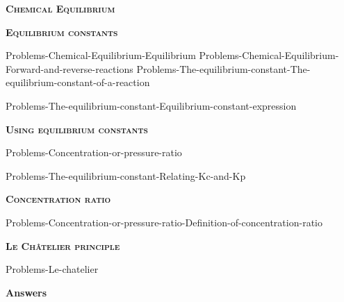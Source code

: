 \documentclass[main.tex]{subfiles}
\newcommand\chapterlabel{Ch-equilibrium}
\begin{document}
\newpage

\fancyhfoffset[E,O]{0pt}
\setlength{\columnsep}{30pt}
\begin{conclusion}
\end{conclusion}
\begin{multicols*}{2}\setcounter{numA}{1}



{\raggedright\textsc{\textbf{Chemical Equilibrium }}\par}



{\raggedright\textsc{\textbf{Equilibrium constants }}\par}






{Problems-Chemical-Equilibrium-Equilibrium}
{Problems-Chemical-Equilibrium-Forward-and-reverse-reactions}
{Problems-The-equilibrium-constant-The-equilibrium-constant-of-a-reaction}

{Problems-The-equilibrium-constant-Equilibrium-constant-expression}






{\raggedright\textsc{\textbf{Using equilibrium constants }}\par}
{Problems-Concentration-or-pressure-ratio}

{Problems-The-equilibrium-constant-Relating-Kc-and-Kp}



{\raggedright\textsc{\textbf{Concentration ratio }}\par}
{Problems-Concentration-or-pressure-ratio-Definition-of-concentration-ratio}




{\raggedright\textsc{\textbf{Le Ch\^{a}telier principle}}\par}
{Problems-Le-chatelier}









\end{multicols*}

\newpage
\begin{answersenvironment}
\begin{minipage}[c]{1\textwidth}
\begin{localsize}{10}
{\Large \bf Answers}
 \printsolutions[byID={1,3,5,7,9,11,13,15,17}]
\end{localsize}
\end{minipage}\end{answersenvironment}
\end{document}
